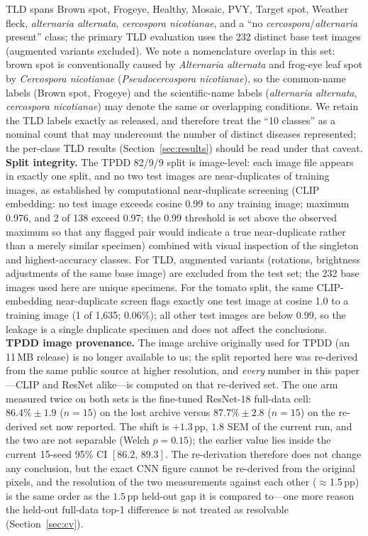 \documentclass[10pt,a4paper]{article}
\begin{document}
TLD spans Brown spot, Frogeye, Healthy, Mosaic, PVY, Target spot, Weather fleck, \textit{alternaria alternata}, \textit{cercospora nicotianae}, and a ``no \textit{cercospora}/\textit{alternaria} present'' class; the primary TLD evaluation uses the 232 distinct base test images (augmented variants excluded). We note a nomenclature overlap in this set: brown spot is conventionally caused by \textit{Alternaria alternata} and frog-eye leaf spot by \textit{Cercospora nicotianae} (\textit{Pseudocercospora nicotianae}), so the common-name labels (Brown spot, Frogeye) and the scientific-name labels (\textit{alternaria alternata}, \textit{cercospora nicotianae}) may denote the same or overlapping conditions. We retain the TLD labels exactly as released, and therefore treat the ``10 classes'' as a nominal count that may undercount the number of distinct diseases represented; the per-class TLD results (Section~\ref{sec:results}) should be read under that caveat.
\textbf{Split integrity.} The TPDD 82/9/9 split is image-level: each image file appears in exactly one split, and no two test images are near-duplicates of training images, as established by computational near-duplicate screening (CLIP embedding: no test image exceeds cosine 0.99 to any training image; maximum 0.976, and 2 of 138 exceed 0.97; the 0.99 threshold is set above the observed maximum so that any flagged pair would indicate a true near-duplicate rather than a merely similar specimen) combined with visual inspection of the singleton and highest-accuracy classes. For TLD, augmented variants (rotations, brightness adjustments of the same base image) are excluded from the test set; the 232 base images used here are unique specimens. For the tomato split, the same CLIP-embedding near-duplicate screen flags exactly one test image at cosine 1.0 to a training image (1 of 1{,}635; 0.06\%); all other test images are below 0.99, so the leakage is a single duplicate specimen and does not affect the conclusions.
\textbf{TPDD image provenance.} The image archive originally used for TPDD (an 11\,MB release) is no longer available to us; the split reported here was re-derived from the same public source at higher resolution, and \emph{every} number in this paper---CLIP and ResNet alike---is computed on that re-derived set. The one arm measured twice on both sets is the fine-tuned ResNet-18 full-data cell: $86.4\%\pm1.9$ ($n{=}15$) on the lost archive versus $87.7\%\pm2.8$ ($n{=}15$) on the re-derived set now reported. The shift is $+1.3$\,pp, $1.8$ SEM of the current run, and the two are not separable (Welch $p{=}0.15$); the earlier value lies inside the current 15-seed 95\% CI $[86.2,\,89.3]$. The re-derivation therefore does not change any conclusion, but the exact CNN figure cannot be re-derived from the original pixels, and the resolution of the two measurements against each other ($\approx$1.5\,pp) is the same order as the $1.5$\,pp held-out gap it is compared to---one more reason the held-out full-data top-1 difference is not treated as resolvable (Section~\ref{sec:cv}).
\end{document}
